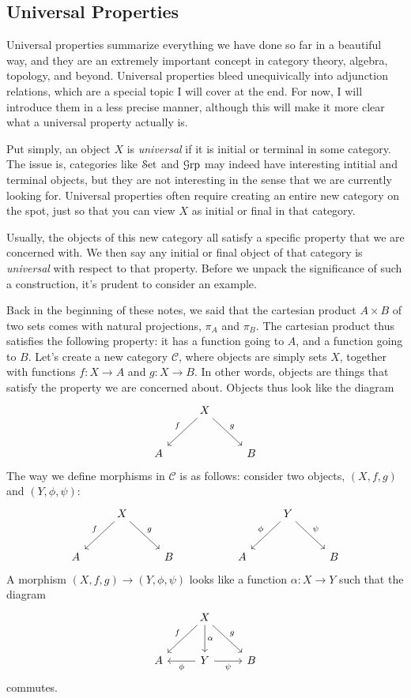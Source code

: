 \subsection{Universal Properties}

Universal properties summarize everything we have done so far in a beautiful way, and they are an extremely important concept in category theory, algebra, topology, and beyond. Universal properties bleed unequivically into adjunction relations, which are a special topic I will cover at the end. For now, I will introduce them in a less precise manner, although this will make it more clear what a universal property actually is.

Put simply, an object $X$ is \emph{universal} if it is initial or terminal in some category. The issue is, categories like $\mathcal{S}\mathrm{et} $ and $\mathcal{G}\mathrm{rp} $ may indeed have interesting intitial and terminal objects, but they are not interesting in the sense that we are currently looking for. Universal properties often require creating an entire new category on the spot, just so that you can view $X$ as initial or final in that category.

Usually, the objects of this new category all satisfy a specific property that we are concerned with. We then say any initial or final object of that category is \emph{universal} with respect to that property. Before we unpack the significance of such a construction, it's prudent to consider an example.

Back in the beginning of these notes, we said that the cartesian product $A\times B$ of two sets comes with natural projections, $\pi_A $ and $\pi _B$. The cartesian product thus satisfies the following property: it has a function going to $A$, and a function going to $B$. Let's create a new category $\mathcal{C} $, where objects are simply sets $X$, together with functions $f : X \to A$ and $g : X \to B$. In other words, objects are things that satisfy the property we are concerned about. Objects thus look like the diagram
\[\begin{tikzcd}[row sep = 2.5em, column sep = 2.5em]
 & X\ar[" f "', dl] \ar[" g ", dr]  &  \\
A &  & B
\end{tikzcd}\]
The way we define morphisms in $\mathcal{C} $ is as follows: consider two objects, $(X,f,g)$ and $(Y,\phi ,\psi )$:
\[\begin{tikzcd}[row sep = 2.5em, column sep = 2.5em]
 & X\ar[" f "', dl] \ar[" g ", dr]  &  &  &  & Y\ar[" \phi  "', dl] \ar[" \psi  ", dr]  &  \\
A &  & B &  & A &  & B
\end{tikzcd}\]
A morphism $(X,f,g)\to (Y,\phi ,\psi )$ looks like a function $\alpha : X \to Y$ such that the diagram
\[\begin{tikzcd}[row sep = 2.5em, column sep = 2.5em]
 & X\ar[" f "', dl] \ar[" g ", dr] \ar[" \alpha  ", d]  &  \\
A & Y\ar[" \phi  ", l] \ar[" \psi  "', r]  & B
\end{tikzcd}\]
commutes.

